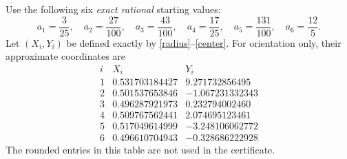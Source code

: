\documentclass[11pt]{article}
\begin{document}
Use the following six \emph{exact rational} starting values:
\begin{equation}\label{samples}
 a_1=\frac3{25},\quad a_2=\frac{27}{100},\quad
 a_3=\frac{43}{100},\quad a_4=\frac{17}{25},\quad
 a_5=\frac{131}{100},\quad a_6=\frac{12}{5}.
\end{equation}
Let $(X_i,Y_i)$ be defined exactly by
\eqref{radius}--\eqref{center}. For orientation only, their
approximate coordinates are
\[
\begin{array}{c|r|r}
i&X_i&Y_i\\ \hline
1&0.531703184427& 9.271732856495\\
2&0.501537653846&-1.067231332343\\
3&0.496287921973& 0.232794002460\\
4&0.509767562441& 2.074695123461\\
5&0.517049614999&-3.248106062772\\
6&0.496610704943&-0.328686222928
\end{array}
\]
The rounded entries in this table are not used in the certificate.
\end{document}
